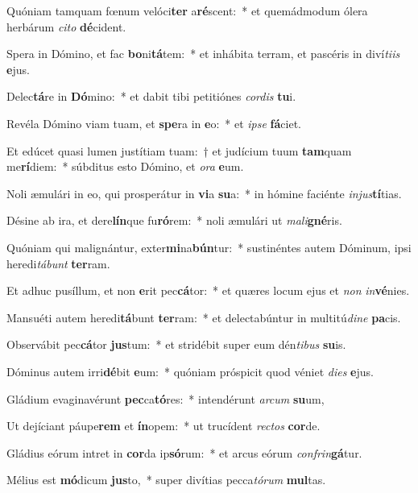 \item Quóniam tamquam fœnum velóci\textbf{ter} a\textbf{ré}scent:~* et quemádmodum ólera herbárum \textit{ci}\textit{to} \textbf{dé}cident.
\item Spera in Dómino, et fac \textbf{bo}ni\textbf{tá}tem:~* et inhábita terram, et pascéris in diví\textit{ti}\textit{is} \textbf{e}jus.
\item Delec\textbf{tá}re in \textbf{Dó}mino:~* et dabit tibi petitiónes \textit{cor}\textit{dis} \textbf{tu}i.
\item Revéla Dómino viam tuam, et \textbf{spe}ra in \textbf{e}o:~* et \textit{ip}\textit{se} \textbf{fá}ciet.
\item Et edúcet quasi lumen justítiam tuam:~† et judícium tuum \textbf{tam}quam me\textbf{rí}diem:~* súbditus esto Dómino, et \textit{o}\textit{ra} \textbf{e}um.
\item Noli æmulári in eo, qui prosperátur in \textbf{vi}a \textbf{su}a:~* in hómine faciénte \textit{in}\textit{jus}\textbf{tí}tias.
\item Désine ab ira, et dere\textbf{lín}que fu\textbf{ró}rem:~* noli æmulári ut \textit{ma}\textit{li}\textbf{gné}ris.
\item Quóniam qui malignántur, exter\textbf{mi}na\textbf{bún}tur:~* sustinéntes autem Dóminum, ipsi heredi\textit{tá}\textit{bunt} \textbf{ter}ram.
\item Et adhuc pusíllum, et non \textbf{e}rit pec\textbf{cá}tor:~* et quæres locum ejus et \textit{non} \textit{in}\textbf{vé}nies.
\item Mansuéti autem heredi\textbf{tá}bunt \textbf{ter}ram:~* et delectabúntur in multitú\textit{di}\textit{ne} \textbf{pa}cis.
\item Observábit pec\textbf{cá}tor \textbf{jus}tum:~* et stridébit super eum dén\textit{ti}\textit{bus} \textbf{su}is.
\item Dóminus autem irri\textbf{dé}bit \textbf{e}um:~* quóniam próspicit quod véniet \textit{di}\textit{es} \textbf{e}jus.
\item Gládium evaginavérunt \textbf{pec}ca\textbf{tó}res:~* intendérunt \textit{ar}\textit{cum} \textbf{su}um,
\item Ut dejíciant páupe\textbf{rem} et \textbf{ín}opem:~* ut trucídent \textit{rec}\textit{tos} \textbf{cor}de.
\item Gládius eórum intret in \textbf{cor}da ip\textbf{só}rum:~* et arcus eórum \textit{con}\textit{frin}\textbf{gá}tur.
\item Mélius est \textbf{mó}dicum \textbf{jus}to,~* super divítias pecca\textit{tó}\textit{rum} \textbf{mul}tas.

